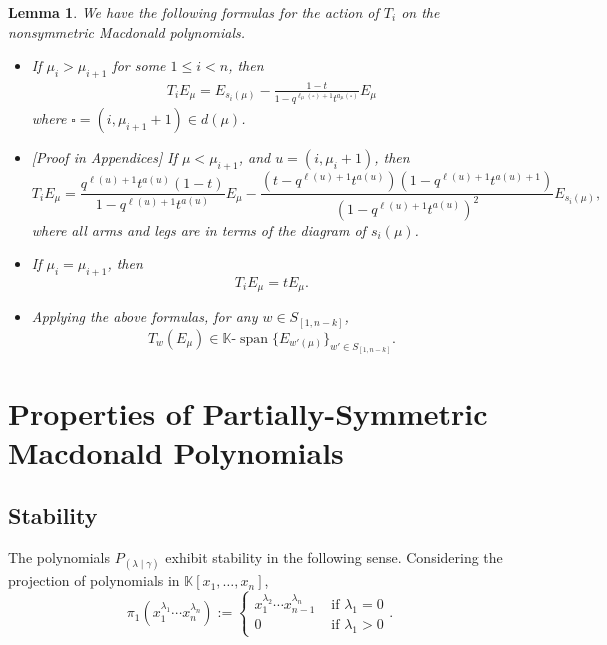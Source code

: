 \documentclass[11pt]{article}
\newtheorem{lemm}[theo]{Lemma}
\theoremstyle{definition}
\numberwithin{equation}{section}
\newcommand{\Lq}{\mathbb{K}}
\newcommand{\Spann}{\text{-}\operatorname{span}}
\newcommand{\Sn}{S_{[1,n-k]}}
\newcommand{\PP}{P_{(\lambda \mid \gamma)}}
\newcommand{\dg}{d}
\begin{document}
\begin{lemm}\label{TiFormulas} We have the following formulas for the action of $T_i$ on the nonsymmetric Macdonald polynomials.
\begin{itemize} \item{} If $\mu_{i}>\mu_{i+1}$ for some $1\le i<n$, then
\begin{align}
\label{E:T-on-E-up}
T_i E_\mu = E_{s_i(\mu)}-\frac{1-t}{1-q^{\ell_\mu(\square)+1}t^{a_\mu(\square)}}E_\mu
\end{align}
where $\square=(i,\mu_{i+1}+1)\in\dg(\mu)$.\\

\item\hspace*{0mm}[Proof in Appendices] If $\mu < \mu_{i+1}$, and $u=(i,\mu_{i}+1)$, then
\begin{equation} \label{decreasingT} T_iE_\mu = \frac{q^{\ell(u)+1}t^{a(u)}(1-t)}{1-q^{\ell(u)+1}t^{a(u)}}E_{\mu} - \frac{(t-q^{\ell(u)+1}t^{a(u)})(1-q^{\ell(u)+1}t^{a(u)+1})}{(1-q^{\ell(u)+1}t^{a(u)})^2} E_{s_i(\mu)},\end{equation}
where all arms and legs are in terms of the diagram of $s_i(\mu)$.\\

\item If $\mu_i = \mu_{i+1}$, then
\begin{equation}\label{simpledz} T_i E_\mu = t E_\mu.\end{equation}

\item Applying the above formulas, for any $w\in \Sn$,
\begin{equation}\label{span}
    T_w(E_\mu) \in \Lq \Spann \{ E_{w'(\mu)} \}_{w' \in \Sn}.
\end{equation}

\end{itemize}
\end{lemm}








\section{Properties of Partially-Symmetric Macdonald Polynomials}
\subsection{Stability}
The polynomials $\PP$ exhibit stability in the following sense. Considering the projection of polynomials in $\mathbb{K}[x_1,\dotsc, x_n]$,
\[ \pi_1(x_1^{\lambda_1} \dotsm x_n^{\lambda_n}) := \begin{cases} x_1^{\lambda_2} \dotsm x_{n-1}^{\lambda_n} &\text{ if } \lambda_1=0\\
0 &\text{ if } \lambda_1 > 0\end{cases}. \]
\end{document}
